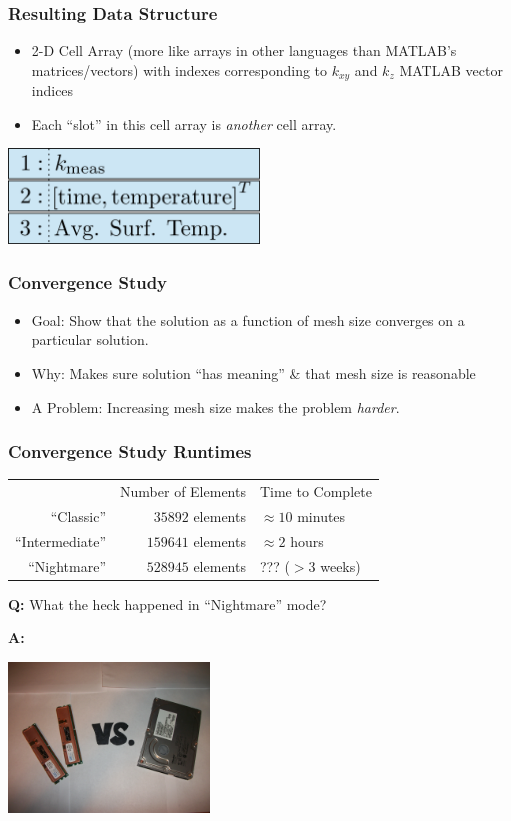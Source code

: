 \documentclass{beamer}
\begin{document}
\begin{frame}
\frametitle{Resulting Data Structure}
\begin{itemize}
\item 2-D Cell Array (more like arrays in other languages than MATLAB's matrices/vectors) with indexes corresponding to \(k_{xy}\) and \(k_z\) MATLAB vector indices
\item Each ``slot'' in this cell array is \emph{another} cell array.
\end{itemize}
\begin{center}
\includegraphics[width=0.5\textwidth]{fig/cell_array.png}
\end{center}
\end{frame}


\begin{frame}
\frametitle{Convergence Study}
\begin{itemize}
\item Goal: Show that the solution as a function of mesh size converges on a particular solution.
\item Why: Makes sure solution ``has meaning'' \& that mesh size is reasonable
\item A Problem: Increasing mesh size makes the problem \emph{harder}.
\end{itemize}
\end{frame}


\begin{frame}
\frametitle{Convergence Study Runtimes}
    \begin{table}
    \begin{tabular}{r | r | l}
     & Number of Elements & Time to Complete\\
    ``Classic'' & \(35892\) elements & \(\approx 10\) minutes\\
    ``Intermediate'' & \(159641\) elements & \(\approx 2\) hours\\
    ``Nightmare'' & \(528945\) elements & ??? (\(>3\) weeks)\\
    \end{tabular}
    \end{table}
\textbf{Q:} What the heck happened in ``Nightmare'' mode?

\textbf{A:}\\
\begin{center}
\includegraphics[width=0.4\textwidth]{fig/thedisk.jpg}
\end{center}
\end{frame}
\end{document}
